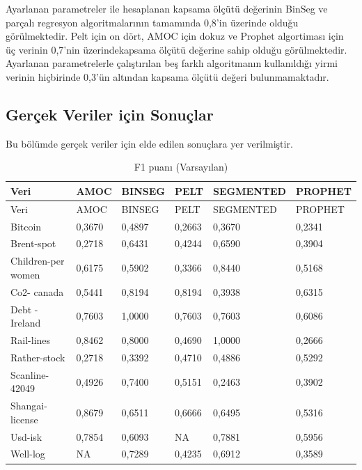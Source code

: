 \documentclass[12pt,twoside]{deuthesis}
\begin{document}
Ayarlanan parametreler ile hesaplanan kapsama ölçütü değerinin BinSeg ve parçalı regresyon algoritmalarının tamamında 0,8'in üzerinde olduğu görülmektedir. Pelt için on dört, AMOC için dokuz ve Prophet algortiması için üç verinin 0,7'nin üzerindekapsama ölçütü değerine sahip olduğu görülmektedir.
Ayarlanan parametrelerle çalıştırılan beş farklı algoritmanın kullanıldığı yirmi verinin hiçbirinde 0,3'ün altından kapsama ölçütü değeri bulunmamaktadır.

\hypertarget{geruxe7ek-veriler-iuxe7in-sonuuxe7lar}{%
\subsection{Gerçek Veriler için Sonuçlar}\label{geruxe7ek-veriler-iuxe7in-sonuuxe7lar}}

Bu bölümde gerçek veriler için elde edilen sonuçlara yer verilmiştir.

\begin{longtable}[]{@{}llllll@{}}
\caption{\label{tab:nvar2} F1 puanı (Varsayılan)}\tabularnewline
\toprule\noalign{}
Veri & AMOC & BINSEG & PELT & SEGMENTED & PROPHET \\
\midrule\noalign{}
\endfirsthead
\toprule\noalign{}
Veri & AMOC & BINSEG & PELT & SEGMENTED & PROPHET \\
\midrule\noalign{}
\endhead
\bottomrule\noalign{}
\endlastfoot
Bitcoin & 0,3670 & 0,4897 & 0,2663 & 0,3670 & 0,2341 \\
Brent-spot & 0,2718 & 0,6431 & 0,4244 & 0,6590 & 0,3904 \\
Children-per women & 0,6175 & 0,5902 & 0,3366 & 0,8440 & 0,5168 \\
Co2- canada & 0,5441 & 0,8194 & 0,8194 & 0,3938 & 0,6315 \\
Debt -Ireland & 0,7603 & 1,0000 & 0,7603 & 0,7603 & 0,6086 \\
Rail-lines & 0,8462 & 0,8000 & 0,4690 & 1,0000 & 0,2666 \\
Rather-stock & 0,2718 & 0,3392 & 0,4710 & 0,4886 & 0,5292 \\
Scanline-42049 & 0,4926 & 0,7400 & 0,5151 & 0,2463 & 0,3902 \\
Shangai-license & 0,8679 & 0,6511 & 0,6666 & 0,6495 & 0,5316 \\
Usd-isk & 0,7854 & 0,6093 & NA & 0,7881 & 0,5956 \\
Well-log & NA & 0,7289 & 0,4235 & 0,6912 & 0,3589 \\
\end{longtable}
\end{document}
